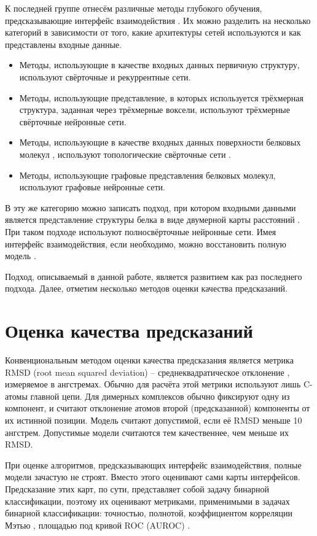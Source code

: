 К последней группе отнесём различные методы глубокого обучения, предсказывающие интерфейс взаимодействия \cite{deep_methods}. Их можно разделить на несколько категорий в зависимости от того, какие архитектуры сетей используются и как представлены входные данные.
\begin{itemize}
\item Методы, использующие в качестве входных данных первичную структуру, используют свёрточные и рекуррентные сети.
\item Методы, использующие представление, в которых используется трёхмерная структура, заданная через трёхмерные воксели, используют трёхмерные свёрточные нейронные сети.
\item Методы, использующие в качестве входных данных поверхности белковых молекул \cite{hang}, используют топологические свёрточные сети \cite{sverrisson}.
\item Методы, использующие графовые представления белковых молекул, используют графовые нейронные сети.
\end{itemize}
В эту же категорию можно записать подход, при котором входными данными является представление структуры белка в виде двумерной карты расстояний \cite{guo}. При таком подходе используют полносвёрточные нейронные сети. Имея интерфейс взаимодействия, если необходимо, можно восстановить полную модель \cite{hadarovich}.

Подход, описываемый в данной работе, является развитием как раз последнего подхода. Далее, отметим несколько методов оценки качества предсказаний.
\section{Оценка качества предсказаний}

Конвенциональным методом оценки качества предсказания является метрика RMSD (root mean squared deviation) – среднеквадратическое отклонение \cite{kufareva}, измеряемое в ангстремах. Обычно для расчёта этой метрики  используют лишь C\textalpha-атомы главной цепи. Для димерных комплексов обычно фиксируют одну из компонент, и считают отклонение атомов второй (предсказанной) компоненты от их истинной позиции. Модель считают допустимой, если её RMSD меньше 10 ангстрем. Допустимые модели считаются тем качественнее, чем меньше их RMSD.

При оценке алгоритмов, предсказывающих интерфейс взаимодействия, полные модели зачастую не строят. Вместо этого оценивают сами карты интерфейсов. Предсказание этих карт, по сути, представляет собой задачу бинарной классификации, поэтому их оценивают метриками, применимыми в задачах бинарной классификации: точностью, полнотой, коэффициентом корреляции Мэтью \cite{deep_methods}, площадью под кривой ROC (AUROC) \cite{bradley}.

